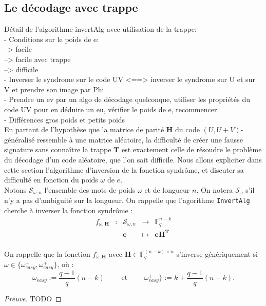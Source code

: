 \documentclass[12pt]{article}
\theoremstyle{definition}
\newcommand{\F}{\mathbb{F}}
\begin{document}
\subsection{Le décodage avec trappe}
Détail de l'algorithme invertAlg avec utilisation de la trappe: \\
- Conditions sur le poids de e: \\
--> facile \\
--> facile avec trappe \\
--> difficile \\
- Inverser le syndrome sur le code UV <==> inverser le syndrome sur U et sur V et prendre son image par Phi. \\
- Prendre un ev par un algo de décodage quelconque, utiliser les propriétés du code UV pour en déduire un eu, vérifier le poids de e, recommencer. \\
- Différences gros poids et petits poids \\

En partant de l'hypothèse que la matrice de parité $\mathbf{H}$ du code $(U,U+V)$-généralisé ressemble à une matrice aléatoire, la difficulté de créer une fausse signature sans connaître la trappe $\mathbf{T}$ est exactement celle de résoudre le problème du décodage d'un code aléatoire, que l'on sait difficile. Nous allons expliciter dans cette section l'algorithme d'inversion de la fonction syndrôme, et discuter sa difficulté en fonction du poids $\omega$ de $e$. \\

Notons $\mathcal{S}_{\omega,n}$ l'ensemble des mots de poids $\omega$ et de longueur $n$. On notera $\mathcal{S}_{\omega}$ s'il n'y a pas d'ambiguité sur la longueur. On rappelle que l'agorithme \verb|InvertAlg| cherche à inverser la fonction syndrôme : 
$$\begin{array}{ccccc}
f_{\omega,\mathbf{H}} & : & \mathcal{S}_{\omega,n} & \to & \F_q^{n-k} \\
 & & \mathbf{e} & \mapsto & \mathbf{eH^T} \\
\end{array}$$

On rappelle que la fonction $f_{\omega,\mathbf{H}}$ avec $\mathbf{H} \in \F_q^{(n-k)\times n}$ s'inverse génériquement si $\omega \in \{\omega_{easy}^-,\omega_{easy}^+\}$, où :
$$ \omega_{easy}^- := \frac{q-1}{q}(n-k) \qquad \text{ et }\qquad  \omega_{easy}^+\} := k + \frac{q-1}{q}(n-k).$$

\begin{proof}[Preuve] TODO
\end{proof}
\end{document}
